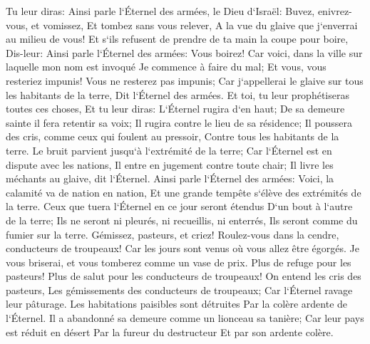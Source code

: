 \verse Tu leur diras: Ainsi parle l`Éternel des armées, le Dieu d`Israël: Buvez, enivrez-vous, et vomissez, Et tombez sans vous relever, A la vue du glaive que j`enverrai au milieu de vous! 
\verse Et s`ils refusent de prendre de ta main la coupe pour boire, Dis-leur: Ainsi parle l`Éternel des armées: Vous boirez! 
\verse Car voici, dans la ville sur laquelle mon nom est invoqué Je commence à faire du mal; Et vous, vous resteriez impunis! Vous ne resterez pas impunis; Car j`appellerai le glaive sur tous les habitants de la terre, Dit l`Éternel des armées. 
\verse Et toi, tu leur prophétiseras toutes ces choses, Et tu leur diras: L`Éternel rugira d`en haut; De sa demeure sainte il fera retentir sa voix; Il rugira contre le lieu de sa résidence; Il poussera des cris, comme ceux qui foulent au pressoir, Contre tous les habitants de la terre. 
\verse Le bruit parvient jusqu`à l`extrémité de la terre; Car l`Éternel est en dispute avec les nations, Il entre en jugement contre toute chair; Il livre les méchants au glaive, dit l`Éternel. 
\verse Ainsi parle l`Éternel des armées: Voici, la calamité va de nation en nation, Et une grande tempête s`élève des extrémités de la terre. 
\verse Ceux que tuera l`Éternel en ce jour seront étendus D`un bout à l`autre de la terre; Ils ne seront ni pleurés, ni recueillis, ni enterrés, Ils seront comme du fumier sur la terre. 
\verse Gémissez, pasteurs, et criez! Roulez-vous dans la cendre, conducteurs de troupeaux! Car les jours sont venus où vous allez être égorgés. Je vous briserai, et vous tomberez comme un vase de prix. 
\verse Plus de refuge pour les pasteurs! Plus de salut pour les conducteurs de troupeaux! 
\verse On entend les cris des pasteurs, Les gémissements des conducteurs de troupeaux; Car l`Éternel ravage leur pâturage. 
\verse Les habitations paisibles sont détruites Par la colère ardente de l`Éternel. 
\verse Il a abandonné sa demeure comme un lionceau sa tanière; Car leur pays est réduit en désert Par la fureur du destructeur Et par son ardente colère. 

